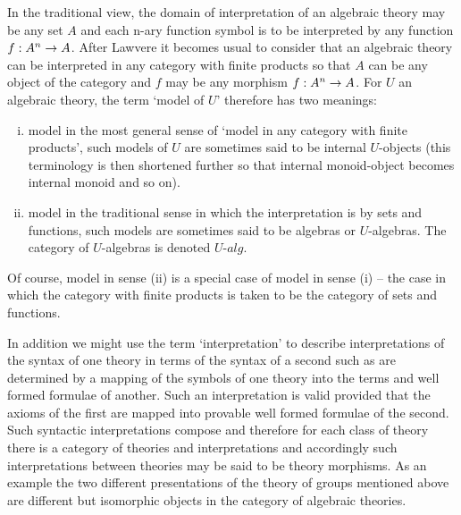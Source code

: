 \note
In the traditional view, the domain of interpretation of an algebraic theory may be any set $A$ 
and each n-ary function symbol is to be interpreted by any  function $f:A^n \rightarrow A$.
After Lawvere it becomes usual to consider that an algebraic theory can be interpreted in any category with finite products
 so that $A$ can be any object of the category and  $f$ may be any morphism $f:A^n \rightarrow A$. 
For $U$ an algebraic theory, the term `model of $U$' therefore has two meanings:
\begin{enumerate}[(i)]
\item model in the most general sense of `model in any category  with finite products',
 such models of $U$ are sometimes said to be internal $U$-objects (this terminology is then shortened further so that internal monoid-object becomes internal monoid and so on). 
\item model in the traditional sense in which the interpretation is by sets and functions, such models are sometimes said to be algebras or
$U$-algebras. The category of $U$-algebras is denoted $U$-$alg$. 
\end{enumerate} 
Of course, model in sense (ii) is a special case of model in sense (i) --  the case in which the category with finite products is taken to be the category of sets and functions.

\note In addition we might use the term `interpretation' to describe interpretations of the syntax of one theory in terms of the syntax of a second
such as are determined by a mapping of the symbols of one theory into the terms and well formed formulae of another. 
Such an interpretation is valid provided that the axioms of the first are mapped into provable well formed formulae of the second.  Such syntactic interpretations compose and therefore for each class of theory there is a category of theories and interpretations and accordingly such 
interpretations between theories may be said to be theory morphisms.
As an example the two different presentations of the theory of groups mentioned above are different but isomorphic objects in the category of algebraic theories. 

